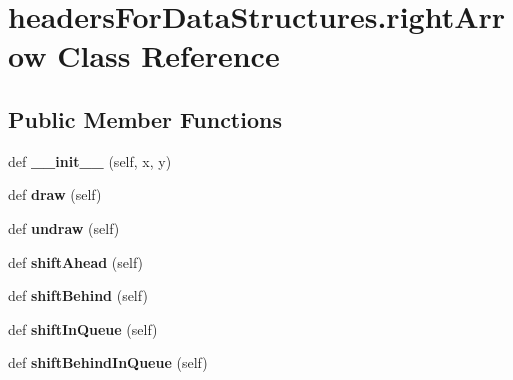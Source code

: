 \hypertarget{classheaders_for_data_structures_1_1right_arrow}{}\section{headers\+For\+Data\+Structures.\+right\+Arrow Class Reference}
\label{classheaders_for_data_structures_1_1right_arrow}
\subsection*{Public Member Functions}
\begin{DoxyCompactItemize}
\item 
def {\bfseries \+\_\+\+\_\+init\+\_\+\+\_\+} (self, x, y)\hypertarget{classheaders_for_data_structures_1_1right_arrow_a0d53d254a151ec5db5331c8a6afd36c0}{}\label{classheaders_for_data_structures_1_1right_arrow_a0d53d254a151ec5db5331c8a6afd36c0}

\item 
def {\bfseries draw} (self)\hypertarget{classheaders_for_data_structures_1_1right_arrow_a0ab3e6bded6c7acb0c4dc9ba61d7ac31}{}\label{classheaders_for_data_structures_1_1right_arrow_a0ab3e6bded6c7acb0c4dc9ba61d7ac31}

\item 
def {\bfseries undraw} (self)\hypertarget{classheaders_for_data_structures_1_1right_arrow_a0a5c65179b5c92ce3d79d6f1c1678b5b}{}\label{classheaders_for_data_structures_1_1right_arrow_a0a5c65179b5c92ce3d79d6f1c1678b5b}

\item 
def {\bfseries shift\+Ahead} (self)\hypertarget{classheaders_for_data_structures_1_1right_arrow_a3a9f5debd35ed66cc2b3a7c64397d530}{}\label{classheaders_for_data_structures_1_1right_arrow_a3a9f5debd35ed66cc2b3a7c64397d530}

\item 
def {\bfseries shift\+Behind} (self)\hypertarget{classheaders_for_data_structures_1_1right_arrow_a3e9d01ac5c06f2c21facde8562303d8f}{}\label{classheaders_for_data_structures_1_1right_arrow_a3e9d01ac5c06f2c21facde8562303d8f}

\item 
def {\bfseries shift\+In\+Queue} (self)\hypertarget{classheaders_for_data_structures_1_1right_arrow_a70f3a761d27bd00ff60b71bd4457752d}{}\label{classheaders_for_data_structures_1_1right_arrow_a70f3a761d27bd00ff60b71bd4457752d}

\item 
def {\bfseries shift\+Behind\+In\+Queue} (self)\hypertarget{classheaders_for_data_structures_1_1right_arrow_a89971076429e090ee142a0ac82dd51ce}{}\label{classheaders_for_data_structures_1_1right_arrow_a89971076429e090ee142a0ac82dd51ce}

\end{DoxyCompactItemize}

